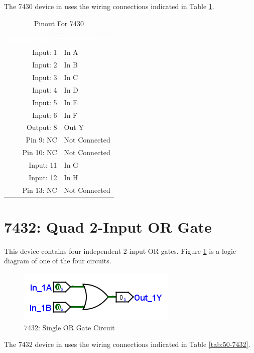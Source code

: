 The 7430 device in \LE uses the wiring connections indicated in Table \ref{tab:50-7430}.

\begin{table}[H]
	\sffamily
	\newcommand{\head}[1]{\textcolor{white}{\textbf{#1}}}		
	\begin{center}
		\begin{tabular}{rl} 
			\rowcolor{black!75}
			\head{Logisim Label} & \head{Function} \\
			Input: 1    & In A \\
			Input: 2    & In B \\
			Input: 3    & In C \\
			Input: 4    & In D \\
			Input: 5    & In E \\
			Input: 6    & In F \\
			Output: 8   & Out Y \\
			Pin 9: NC   & Not Connected \\
			Pin 10: NC  & Not Connected \\
			Input: 11   & In G \\
			Input: 12   & In H  \\
			Pin 13: NC  & Not Connected  \\
		\end{tabular}
	\end{center}
	\caption{Pinout For 7430}
	\label{tab:50-7430}
\end{table}

\section{7432: Quad 2-Input OR Gate}

This device contains four independent 2-input OR gates. Figure \ref{fig:50-7432} is a logic diagram of one of the four circuits.

\begin{figure}[H]
	\centering
	\includegraphics{gfx/50-7432}
	\caption{7432: Single OR Gate Circuit}
	\label{fig:50-7432}
\end{figure}

The 7432 device in \LE uses the wiring connections indicated in Table \ref{tab:50-7432}.

